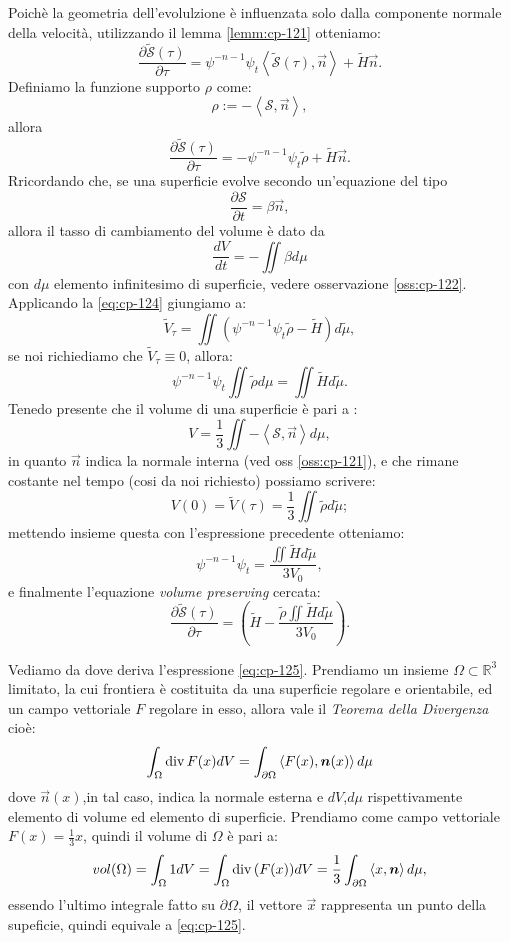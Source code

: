 Poichè la geometria dell'evolulzione è influenzata solo dalla componente normale della velocità, utilizzando il lemma \ref{lemm:cp-121} otteniamo:
\[
\frac{\partial\mathcal{\tilde{S}}(\tau)}{\partial\tau}=\psi^{-n-1}\psi_t\left<\mathcal{\tilde{S}}(\tau),\vec{n}\right>+\tilde{H}\vec{n}.
\]
Definiamo la funzione supporto $\rho$ come:
\[
\rho:=-\left<\mathcal{S},\vec{n}\right>,
\]
allora
\[
\frac{\partial\mathcal{\tilde{S}}(\tau)}{\partial\tau}=-\psi^{-n-1}\psi_t\tilde{\rho}+\tilde{H}\vec{n}.
\]
Rricordando che, se una superficie evolve secondo un'equazione del tipo
\[
\frac{\partial \mathcal{S}}{\partial t}=\beta\vec{n},
\]
allora il tasso di cambiamento del volume è dato da
\begin{equation}
\label{eq:cp-124}
\frac{d V}{d t}=-\iint\beta d\mu
\end{equation}
con $d\mu$ elemento infinitesimo di superficie, vedere osservazione \ref{oss:cp-122}.
 Applicando la \eqref{eq:cp-124} giungiamo a:
\[
\tilde{V}_{\tau}=\iint(\psi^{-n-1}\psi_t\tilde{\rho}-\tilde{H})d\tilde{\mu},
\]
se noi richiediamo che $\tilde{V}_{\tau}\equiv 0$, allora:
\[
\psi^{-n-1}\psi_t\iint\tilde{\rho}d\mu = \iint\tilde{H}d\tilde{\mu}.
\]
 Tenedo presente che il volume di una superficie è pari a :
\begin{equation}
  \label{eq:cp-125}
V=\frac{1}{3}\iint-\left<\mathcal{S},\vec{n}\right>d\mu,
\end{equation}
in quanto $\vec{n}$ indica la normale interna (ved oss \ref{oss:cp-121}), e che rimane costante nel tempo (cosi da noi richiesto) possiamo scrivere:
\[
V(0)=\tilde{V}(\tau)=\frac{1}{3}\iint\tilde{\rho}d\tilde{\mu};
\]
mettendo insieme questa con l'espressione precedente otteniamo:
\[
\psi^{-n-1}\psi_t=\frac{\iint\tilde{H}d\tilde{\mu}}{3V_0},
\]
e finalmente l'equazione \emph{volume preserving} cercata:
\begin{equation}
\label{eq:cp-126}
\frac{\partial\mathcal{\tilde{S}}(\tau)}{\partial\tau}=\left(\tilde{H}-\frac{\tilde{\rho}\iint\tilde{H}d\tilde{\mu}}{3V_0}\right).
\end{equation}
\begin{osservazione}
\label{oss:cp-121}
Vediamo da dove deriva l'espressione \eqref{eq:cp-125}. Prendiamo un insieme $\Omega\subset\mathbb{R}^3$ limitato, la cui frontiera è costituita da una superficie regolare e orientabile, ed un campo vettoriale $F$ regolare in esso, allora vale il \emph{Teorema della Divergenza} cioè:
\[
\int_{\Omega}\operatorname{div}{F(x)}dV =\int_{\partial\Omega}\left<F(x),\bm{n}(x)\right>d\mu
\]
dove $\vec{n}(x)$,in tal caso, indica la normale esterna e $dV$,$d\mu$ rispettivamente elemento di volume ed elemento di superficie. Prendiamo come campo vettoriale $F(x)=\frac{1}{3}x$, quindi il volume di $\Omega$ è pari a:
\[
vol(\Omega)=\int_{\Omega}1dV=\int_{\Omega}\operatorname{div}{(F(x))}dV=\frac{1}{3}\int_{\partial\Omega}\left<x,\bm{n}\right>d\mu,
\]
essendo l'ultimo integrale fatto su $\partial\Omega$, il vettore $\vec{x}$ rappresenta un punto della supeficie, quindi equivale a \eqref{eq:cp-125}.
\end{osservazione}

